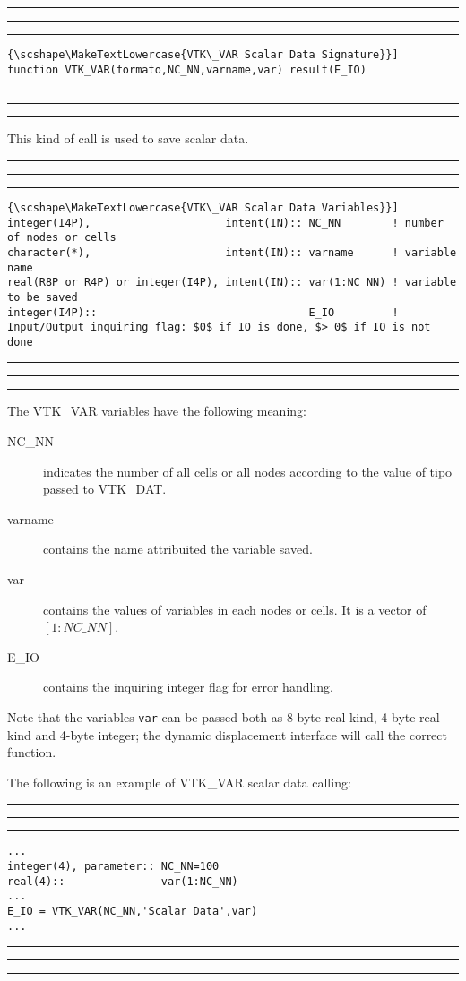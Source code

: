 \documentclass[pagesize=pdftex,fontsize=10pt,paper=a4,oneside]{scrbook}
\DeclareRobustCommand{\MarginNote}[1]{\marginpar{%
\slshape\footnotesize%
\parindent=0pt\lineskip=0pt\lineskiplimit=0pt%
\tolerance=2000\hyphenpenalty=300\exhyphenpenalty=300%
\doublehyphendemerits=100000\finalhyphendemerits=\doublehyphendemerits%
\raggedright\hspace{0pt}#1}}
\newenvironment{boxred}[1]%
               {%
                \noindent\hspace*{-0.025\textwidth}%
                \color{Maroon}%
                \rule[-5.8pt]{0.6pt}{6pt}\hspace*{-0.6pt}\rule{1.05\textwidth}{0.6pt}\hspace*{-0.6pt}\rule[-5.8pt]{0.6pt}{6pt}%
                \color{black}%
                \vspace*{0.6pt}\MarginNote{\color{Maroon}{#1}}%
               }%
               {%
                \noindent\hspace*{-0.025\textwidth}%
                \color{Maroon}%
                \rule[0pt]{0.6pt}{6pt}\hspace*{-0.6pt}\rule{1.05\textwidth}{0.6pt}\hspace*{-0.6pt}\rule[0pt]{0.6pt}{6pt}%
                \color{black}%
                \vspace*{2mm}%
               }
\DeclareRobustCommand{\MaiuscolettoBS}[1]{\textls[80]{\scshape\MakeTextLowercase{#1}}}
\begin{document}
\begin{boxred}{}
\begin{lstlisting}[style=signature,title=\color{Maroon}\MaiuscolettoBS{VTK\_VAR Scalar Data Signature}]
function VTK_VAR(formato,NC_NN,varname,var) result(E_IO)
\end{lstlisting}
\end{boxred}

This kind of call is used to save scalar data.

\begin{boxred}{}
\begin{lstlisting}[style=variables,title=\color{Maroon}\MaiuscolettoBS{VTK\_VAR Scalar Data Variables}]
integer(I4P),                     intent(IN):: NC_NN        ! number of nodes or cells
character(*),                     intent(IN):: varname      ! variable name
real(R8P or R4P) or integer(I4P), intent(IN):: var(1:NC_NN) ! variable to be saved
integer(I4P)::                                 E_IO         ! Input/Output inquiring flag: $0$ if IO is done, $> 0$ if IO is not done
\end{lstlisting}
\end{boxred}

The VTK\_VAR variables have the following meaning:

\begin{description}
 \item[{\color{RoyalBlue}NC\_NN}] indicates the number of all cells or all nodes according to the value of
                                  {\color{RoyalBlue}tipo} passed to VTK\_DAT.
 \item[{\color{RoyalBlue}varname}] contains the name attribuited the variable saved.
 \item[{\color{RoyalBlue}var}] contains the values of variables in each nodes or cells. It is a vector of $[1:NC\_NN]$.
 \item[{\color{RoyalBlue}E\_IO}] contains the inquiring integer flag for error handling.
\end{description}

Note that the variables \texttt{var} can be passed both as 8-byte real kind, 4-byte real kind and 4-byte integer; the
dynamic displacement interface will call the correct function.

The following is an example of VTK\_VAR scalar data calling:

\begin{boxred}{VTK\_VAR Scalar Data Calling}
\begin{verbatim}
...
integer(4), parameter:: NC_NN=100
real(4)::               var(1:NC_NN)
...
E_IO = VTK_VAR(NC_NN,'Scalar Data',var)
...
\end{verbatim}
\end{boxred}
\end{document}
